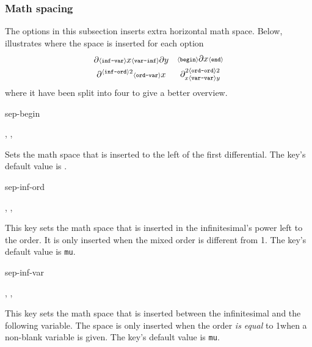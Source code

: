 	\subsubsection*{Math spacing}
	The options in this subsection inserts extra horizontal math space. Below, illustrates where the space is inserted for each option
	\begin{align*}
		\begin{gathered}
			\partial {\scriptstyle\langle\texttt{inf-var}\rangle} x {\scriptstyle\langle\texttt{var-inf}\rangle} \partial y \\
			\partial^{ {\scriptstyle\langle\texttt{inf-ord}\rangle} 2 } {\scriptstyle\langle\texttt{ord-var}\rangle} x
		\end{gathered}
		&&
		\begin{gathered}
			{\scriptstyle\langle\texttt{begin}\rangle} \partial x {\scriptstyle\langle\texttt{end}\rangle} \\
			\partial^{ 2{\scriptstyle\langle\texttt{ord-ord}\rangle} 2 }_{ x {\scriptstyle\langle\texttt{var-var}\rangle} y }
		\end{gathered}
	\end{align*}
	where it have been split into four to give a better overview.
	
	\begin{option}{sep-begin}
		\begin{values}[default = \cs{mathop}\{\}\cs{!}]
			, , 
		\end{values}
		Sets the math space that is inserted to the left of the first differential. The key's default value is .
	\end{option}
	
	\begin{option}{sep-inf-ord}
		\begin{values}[default = 0]
			, , 
		\end{values}
		This key sets the math space that is inserted in the infinitesimal's power left to the order. It is only inserted when the mixed order is different from \num{1}. The key's default value is  \texttt{mu}.
	\end{option}
	
	\begin{option}{sep-inf-var}
		\begin{values}[default = 0]
			, , 
		\end{values}
		This key sets the math space that is inserted between the infinitesimal and the following variable. The space is only inserted when the order \emph{is equal} to \num{1}when a non-blank variable is given. The key's default value is  \texttt{mu}.
	\end{option}
	
